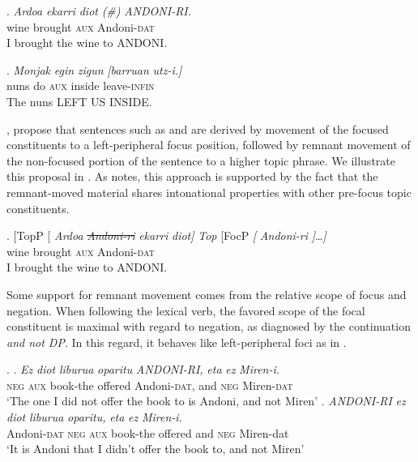 \documentclass[output=paper]{langscibook}
\begin{document}
\exg. \textit{Ardoa} \textit{ekarri} \textit{diot} \textit{(\#)} \textit{ANDONI-RI.} \\
wine brought \textsc{aux} {} Andoni-\textsc{dat} \\
I brought the wine to ANDONI. \\
\citep{elordieta2001}

\exg. \textit{Monjak} \textit{egin} \textit{zigun} \textit{[barruan} \textit{utz-i.]} \\
nuns do \textsc{aux} inside leave-\textsc{infin} \\
The nuns LEFT US INSIDE. \\
\citep{haddican2007}


\cite{ortizdeurbina2002}, \cite{uribeetxebarria2003} propose that sentences such as \LLast and \Last are derived by movement of the focused constituents to a left-peripheral focus position, followed by remnant movement of the non-focused portion of the sentence to a higher topic phrase.  We illustrate this proposal in \Next. As \cite{ortizdeurbina2002} notes, this approach is supported by the fact that the remnant-moved material shares intonational properties with other pre-focus topic constituents.  

\exig. [TopP [ \textit{Ardoa} \textit{\st{Andoni-ri}} \textit{ekarri} \textit{diot]} \textit{Top} [FocP \textit{[} \textit{Andoni-ri} \textit{]}\ldots  \textit{]}  \\
{} {} wine {} brought \textsc{aux} {} {} {} Andoni-\textsc{dat} \\\protect\label{ardoa}
I brought the wine to ANDONI. 
	
	
	Some support for remnant movement comes from the relative scope of focus and negation. When following the lexical verb, the favored scope of the focal constituent is maximal with regard to negation, as diagnosed by the continuation \textit{and not DP}. In this regard, it behaves like left-peripheral foci as in \Next[b] \citep{ortizdeurbina2002}.
	
\ex.	
\ag. \textit{Ez} \textit{diot} \textit{liburua} \textit{oparitu} \textit{ANDONI-RI,} \textit{eta} \textit{ez} \textit{Miren-i.}\\
\textsc{neg} \textsc{aux} book-the offered Andoni-\textsc{dat}, and \textsc{neg} Miren-\textsc{dat}\\
`The one I did not offer the book to is Andoni, and not Miren'
\bg. \textit{ANDONI-RI} \textit{ez} \textit{diot} \textit{liburua} \textit{oparitu,} \textit{eta} \textit{ez} \textit{Miren-i.}\\
Andoni-\textsc{dat} \textsc{neg} \textsc{aux} book-the offered and \textsc{neg} Miren-dat\\
`It is Andoni that I didn't offer the book to, and not Miren'
	
\end{document}
